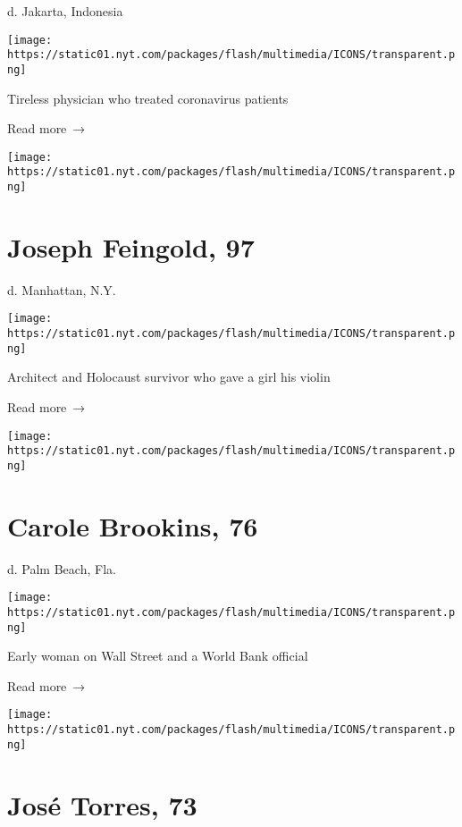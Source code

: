 d. Jakarta, Indonesia

\texttt{[image: https://static01.nyt.com/packages/flash/multimedia/ICONS/transparent.png]}

Tireless physician who treated coronavirus patients

 Read more~→

\href{https://www.nytimes.com/2020/04/22/obituaries/joseph-feingold-dead-coronavirus.html}{}

\texttt{[image: https://static01.nyt.com/packages/flash/multimedia/ICONS/transparent.png]}

\hypertarget{joseph-feingold-97}{%
\section{Joseph Feingold, 97}\label{joseph-feingold-97}}

d. Manhattan, N.Y.

\texttt{[image: https://static01.nyt.com/packages/flash/multimedia/ICONS/transparent.png]}

Architect and Holocaust survivor who gave a girl his violin

 Read more~→

\href{https://www.nytimes.com/2020/04/22/obituaries/carole-brookins-dead-coronavirus.html}{}

\texttt{[image: https://static01.nyt.com/packages/flash/multimedia/ICONS/transparent.png]}

\hypertarget{carole-brookins-76}{%
\section{Carole Brookins, 76}\label{carole-brookins-76}}

d. Palm Beach, Fla.

\texttt{[image: https://static01.nyt.com/packages/flash/multimedia/ICONS/transparent.png]}

Early woman on Wall Street and a World Bank official

 Read more~→

\href{https://www.nytimes.com/2020/04/22/nyregion/jose-torres-dead-coronavirus.html}{}

\texttt{[image: https://static01.nyt.com/packages/flash/multimedia/ICONS/transparent.png]}

\hypertarget{josuxe9-torres-73}{%
\section{José Torres, 73}\label{josuxe9-torres-73}}

